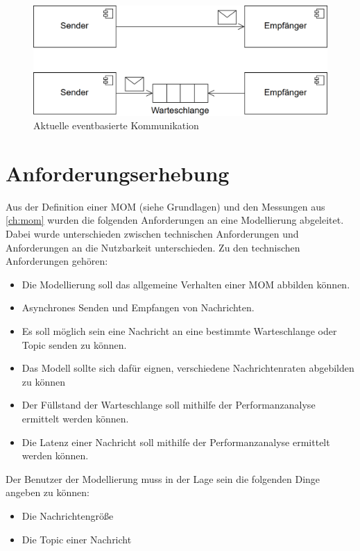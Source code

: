 \begin{figure}
\center
  \includegraphics[width=1\textwidth]{images/modelling/oldEventBased.png}
  \caption{Aktuelle eventbasierte Kommunikation}
  \label{img:oldEventBased}
\end{figure}


\section{Anforderungserhebung}
\label{sec:anforderungserhebung}
Aus der Definition einer MOM (siehe Grundlagen) und den Messungen aus \autoref{ch:mom} wurden die folgenden Anforderungen an eine Modellierung abgeleitet. Dabei wurde unterschieden zwischen technischen Anforderungen und Anforderungen an die Nutzbarkeit unterschieden. 
Zu den technischen Anforderungen gehören:
\begin{itemize}
    \item Die Modellierung soll das allgemeine Verhalten einer MOM abbilden können.
    \item Asynchrones Senden und Empfangen von Nachrichten.
    \item Es soll möglich sein eine Nachricht an eine bestimmte Warteschlange oder Topic senden zu können.
    \item Das Modell sollte sich dafür eignen, verschiedene Nachrichtenraten abgebilden zu können
    \item Der Füllstand der Warteschlange soll mithilfe der Performanzanalyse ermittelt werden können.
    \item Die Latenz einer Nachricht soll mithilfe der Performanzanalyse ermittelt werden können.
\end{itemize}
Der Benutzer der Modellierung muss in der Lage sein die folgenden Dinge angeben zu können:
\begin{itemize}
    \item Die Nachrichtengröße
    \item Die Topic einer Nachricht
\end{itemize}

